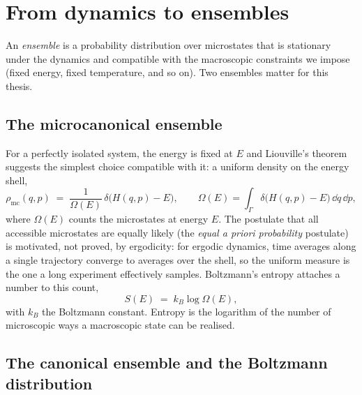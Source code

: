\section{From dynamics to ensembles}\label{sec:ensembles}

An \emph{ensemble} is a probability distribution over microstates that is
stationary under the dynamics and compatible with the macroscopic
constraints we impose (fixed energy, fixed temperature, and so on). Two
ensembles matter for this thesis.

\subsection{The microcanonical ensemble}

For a perfectly isolated system, the energy is fixed at $E$ and
Liouville's theorem suggests the simplest choice compatible with it: a
uniform density on the energy shell,
\begin{equation}
  \rho_{\mathrm{mc}}(q, p)
  \;=\; \frac{1}{\Omega(E)}\,
        \delta\big(H(q,p) - E\big),
  \qquad
  \Omega(E) = \int_\Gamma \delta\big(H(q,p) - E\big)\,\dd q\,\dd p ,
  \label{eq:microcanonical}
\end{equation}
where $\Omega(E)$ counts the microstates at energy $E$. The postulate
that all accessible microstates are equally likely (the \emph{equal a
priori probability} postulate) is motivated, not proved, by ergodicity:
for ergodic dynamics, time averages along a single trajectory converge to
averages over the shell, so the uniform measure is the one a long
experiment effectively samples. Boltzmann's entropy attaches a number to
this count,
\begin{equation}
  S(E) \;=\; k_B \log \Omega(E),
  \label{eq:boltzmann-entropy}
\end{equation}
with $k_B$ the Boltzmann constant. Entropy is the logarithm of the number
of microscopic ways a macroscopic state can be realised.

\subsection{The canonical ensemble and the Boltzmann distribution}
\label{sec:canonical}

